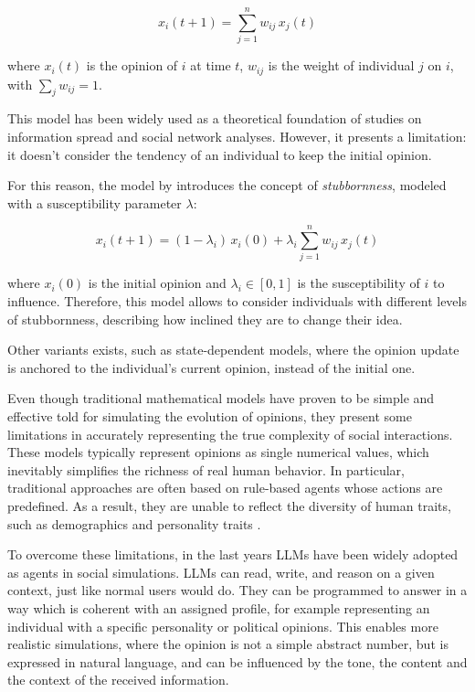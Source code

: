 \[
x_i(t+1) = \sum_{j=1}^n w_{ij} \, x_j(t)
\]

where $x_i(t)$ is the opinion of $i$ at time $t$, $w_{ij}$ is the weight of individual $j$ on $i$, with $\sum_{j} w_{ij}=1$.

This model has been widely used as a theoretical foundation of studies on information spread and social network analyses. However, it presents a limitation: it doesn’t consider the tendency of an individual to keep the initial opinion.

For this reason, the model by \citet{friedkin_1990} introduces the concept of \textit{stubbornness}, modeled with a susceptibility parameter $\lambda$:

\[
x_i(t+1) = (1 - \lambda_i) \, x_i(0) + \lambda_i \sum_{j=1}^n w_{ij} \, x_j(t)
\]

where $x_i(0)$ is the initial opinion and $\lambda_i \in [0, 1]$ is the susceptibility of $i$ to influence.
Therefore, this model allows to consider individuals with different levels of stubbornness, describing how inclined they are to change their idea.

Other variants exists, such as state-dependent models, where the opinion update is anchored to the individual's current opinion, instead of the initial one.


\medskip
Even though traditional mathematical models have proven to be simple and effective told for simulating the evolution of opinions, they present some limitations in accurately representing the true complexity of social interactions.
These models typically represent opinions as single numerical values, which inevitably simplifies the richness of real human behavior.
In particular, traditional approaches are often based on rule-based agents whose actions are predefined.
As a result, they are unable to reflect the diversity of human traits, such as demographics and personality traits \cite{cau2025languagedrivenopiniondynamicsagentbased}.


\medskip
To overcome these limitations, in the last years LLMs have been widely adopted as agents in social simulations.
LLMs can read, write, and reason on a given context, just like normal users would do.
They can be programmed to answer in a way which is coherent with an assigned profile, for example representing an individual with a specific personality or political opinions.
This enables more realistic simulations, where the opinion is not a simple abstract number, but is expressed in natural language, and can be influenced by the tone, the content and the context of the received information.

